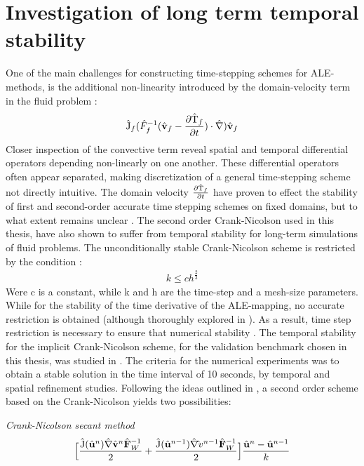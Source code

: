 \section{Investigation of long term temporal stability}
One of the main challenges for constructing time-stepping schemes for ALE-methods, is the additional non-linearity introduced by the domain-velocity term in the fluid problem \cite{Formaggia2004}:
\begin{align}
\text{\^{J}}_f (\hat{F}_f^{-1}(\hat{\mathbf{v}}_f - \frac{\partial \text{\^{T}}_f}{\partial t}) \cdot \hat{\nabla}) \hat{\mathbf{v}}_f
\end{align} 
Closer inspection of the convective term reveal spatial and temporal differential operators depending non-linearly on one another. These differential operators often appear separated, making discretization of a general time-stepping scheme not directly intuitive. The domain velocity $ \frac{\partial \text{\^{T}}_f}{\partial t}$ have proven to effect the stability of first and second-order accurate time stepping schemes on fixed domains, but to what extent remains unclear \cite{Formaggia2004, Formaggia1991}. The second order Crank-Nicolson used in this thesis, have also shown to suffer from temporal stability for long-term simulations of fluid problems. The unconditionally stable Crank-Nicolson scheme is restricted by the condition \cite{Wick2013a}:
\begin{align}
k \leq ch^{\frac{2}{3}} 
\end{align}
Were c is a constant, while k and h are the time-step and a mesh-size parameters. While for the stability of the time derivative of the ALE-mapping, no accurate restriction is obtained (although thoroughly explored in \cite{Formaggia2004}). As a result, time step restriction is necessary to ensure that numerical stability  \cite{Formaggia2004}. The temporal stability for the implicit Crank-Nicolson scheme, for the validation benchmark chosen in this thesis, was studied in \cite{Richter2015}. The criteria for the numerical experiments was to obtain a stable solution in the time interval of 10 seconds, by temporal and spatial refinement studies. Following the ideas outlined in \cite{Richter2015}, a second order scheme based on the Crank-Nicolson yields two possibilities:
\begin{discr}
\textit{Crank-Nicolson secant method }
\begin{align*}
\Big[\frac{\text{\^{J}}(\hat{\mathbf{u}}^{n}) \hat{\mathbf{\nabla}} \hat{\mathbf{v}}^{n} \hat{\mathbf{F}}_W^{-1}}{2} 
+ \frac{\text{\^{J}}(\hat{\mathbf{u}}^{n-1}) \hat{\mathbf{\nabla}} \hat{\mathbf{}}v^{n-1} \hat{\mathbf{F}}_W^{-1}}{2} \Big] 
\frac{\hat{\mathbf{u}}^{n} - \hat{\mathbf{u}}^{n-1}}{k}
\end{align*} 
\label{eq:cn1}
\end{discr}
